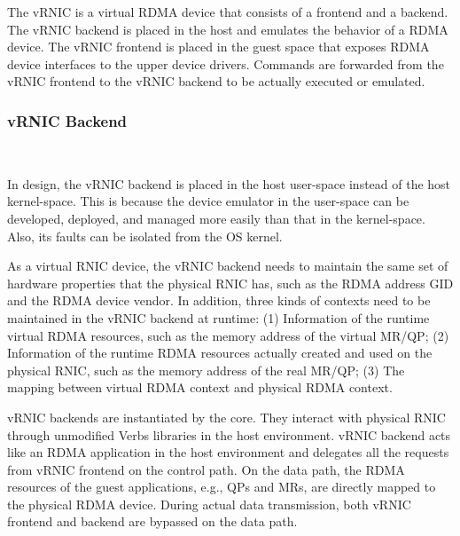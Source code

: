 
The vRNIC is a virtual RDMA device that consists of a frontend and a backend. The vRNIC backend is placed in the host and emulates the behavior of a RDMA device. The vRNIC frontend is placed in the guest space that exposes RDMA device interfaces to the upper device drivers. Commands are forwarded from the vRNIC frontend to the vRNIC backend to be actually executed or emulated.

\subsubsection{\textbf{vRNIC Backend}}
\
\noindent



In \sys design, the vRNIC backend is placed in the host user-space instead of the host kernel-space. This is because the device emulator in the user-space can be developed, deployed, and managed more easily than that in the kernel-space. Also, its faults can be isolated from the OS kernel.


As a virtual RNIC device, the vRNIC backend needs to maintain the same set of hardware properties that the physical RNIC has, such as the RDMA address GID and the RDMA device vendor. In addition, three kinds of contexts need to be maintained in the vRNIC backend at runtime:
(1) Information of the runtime virtual RDMA resources, such as the memory address of the virtual MR/QP;
(2) Information of the runtime RDMA resources actually created and used on the physical RNIC, such as the memory address of the real MR/QP;
(3) The mapping between virtual RDMA context and physical RDMA context.

vRNIC backends are instantiated by the \sys core. They interact with physical RNIC through unmodified Verbs libraries in the host environment. vRNIC backend acts like an RDMA application in the host environment and delegates all the requests from vRNIC frontend on the control path. On the data path, the RDMA resources of the guest applications, e.g., QPs and MRs, are directly mapped to the physical RDMA device. During actual data transmission, both vRNIC frontend and backend are bypassed on the data path.


